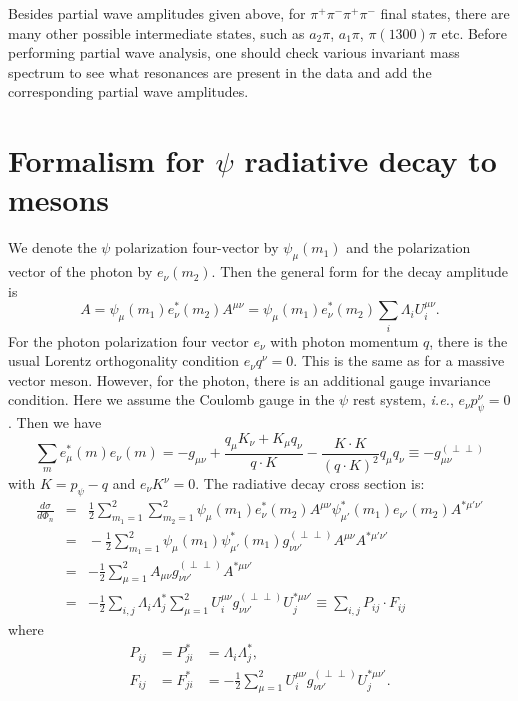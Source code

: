 Besides partial wave amplitudes given above, for
$\pi^+\pi^-\pi^+\pi^-$ final states, there are many other possible
intermediate states, such as $a_2\pi$, $a_1\pi$, $\pi(1300)\pi$
etc. Before performing partial wave analysis, one should check
various invariant mass spectrum to see what resonances are present
in the data and add the corresponding partial wave amplitudes.

\section{Formalism for $\psi$ radiative decay to mesons}

We denote the $\psi$ polarization four-vector by $\psi_\mu(m_1)$
and the polarization vector of the photon by $e_\nu(m_2)$. Then
the general form for the decay amplitude is
\begin{equation}
A=\psi_\mu(m_1) e^*_\nu(m_2) A^{\mu\nu} =\psi_\mu(m_1)
e^*_\nu(m_2)\sum_i\Lambda_i U_i^{\mu\nu}.
\end{equation}
For the  photon polarization four vector $e_\nu$ with photon
momentum $q$, there is the usual Lorentz orthogonality condition
$e_\nu q^\nu=0$. This is the same as for a massive vector meson.
However, for the photon, there is an additional gauge invariance
condition. Here we assume the Coulomb gauge in the $\psi$ rest
system, {\sl i.e.}, $e_\nu p^\nu_\psi=0$. Then we have
\cite{Greiner}
\begin{equation}
\sum_m e^*_\mu(m) e_\nu(m) = -g_{\mu\nu}+\frac{q_\mu K_\nu+
K_\mu q_\nu}{q\!\cdot\! K}-\frac{K\!\cdot\! K}{(q\!\cdot\! K)^2}q_\mu
q_\nu
\equiv -g^{(\perp\perp)}_{\mu\nu}
\end{equation}
with $K=p_\psi-q$ and $e_\nu K^\nu=0$. The radiative decay cross
section is:
\begin{eqnarray}
\frac{d\sigma}{d\Phi_n}\!&=&\!\frac{1}{2}\sum^2_{m_1=1}\sum^2_{m_2=1}
\psi_{\mu}(m_1) e^*_{\nu}(m_2)A^{\mu\nu}
\psi^*_{\mu'}(m_1) e_{\nu'}(m_2)A^{*\mu'\nu'} \nonumber\\
\!&=&\!-\frac{1}{2}\sum^2_{m_1=1}
\psi_{\mu}(m_1)\psi^*_{\mu'}(m_1) g^{(\perp\perp)}_{\nu\nu'}
A^{\mu\nu}A^{*\mu'\nu'}\nonumber\\
&=& -\frac{1}{2}\sum^2_{\mu=1}A_{\mu\nu}
g^{(\perp\perp)}_{\nu\nu'}A^{*\mu\nu'}\nonumber\\
&=& -\frac{1}{2}\sum_{i,j}\Lambda_i\Lambda_j^*\sum^2_{\mu=1}
U_i^{\mu\nu}g^{(\perp\perp)}_{\nu\nu'}U_j^{*\mu\nu'}
 \equiv \sum_{i,j}P_{ij}\cdot F_{ij}
\end{eqnarray}
where
\begin{eqnarray}
P_{ij} &= P^*_{ji} &= \Lambda_i\Lambda^*_j, \\
F_{ij} &= F^*_{ji} &= -\frac{1}{2}\sum^2_{\mu=1}
U_i^{\mu\nu}g^{(\perp\perp)}_{\nu\nu'}U_j^{*\mu\nu'}.
\end{eqnarray}

